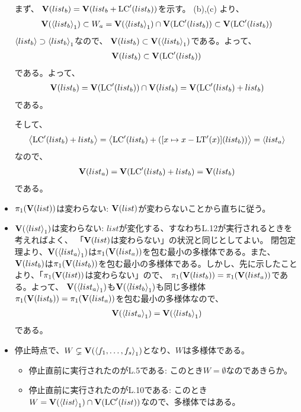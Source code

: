 \documentclass[9pt]{ltjsarticle}
\begin{document}
\begin{myproof}
\begin{itemize}
    まず、
    $\textbf V(list_b) = \textbf V(list_b + {\rm LC}'(list_b))$を示す。
    (b),(c)
    より、
    \begin{align}
      \textbf V(\left\langle list_b \right\rangle_1) \subset W_a =
      \textbf V(\left\langle list_b \right\rangle_1) \cap \textbf V({\rm LC}'(list_b))
      \subset
      \textbf V({\rm LC}'(list_b))
    \end{align}
    $\left\langle list_b \right\rangle \supset \left\langle list_b \right\rangle_1$なので、
    $\textbf V(list_b) \subset \textbf V(\left\langle list_b \right\rangle_1)$である。よって、
    \begin{align}
      \textbf V(list_b) \subset \textbf V({\rm LC}'(list_b))
    \end{align}
    である。よって、
    \begin{align}
      \textbf V(list_b) = \textbf V({\rm LC}'(list_b))\cap \textbf V(list_b) =
      \textbf V({\rm LC}'(list_b) + list_b)
    \end{align}
    である。

    そして、
    \begin{align}
      \left\langle {\rm LC}'(list_b) + list_b \right\rangle =
      \left\langle {\rm LC}'(list_b) + ([x\mapsto x-{\rm LT}'(x)](list_b))  \right\rangle
      = \left\langle list_a \right\rangle
    \end{align}
    なので、
    \begin{align}
      \textbf V(list_a) = \textbf V({\rm LC}'(list_b) + list_b)
      =
      \textbf V(list_b)
    \end{align}
    である。

    \item $\pi_1(\textbf V(list))$は変わらない:
    $\textbf V(list)$が変わらないことから直ちに従う。
    \item $\textbf V(\left\langle list \right\rangle_1)$は変わらない:
    $list$が変化する、すなわちL.12が実行されるときを考えればよく、
    「$\textbf V(list)$は変わらない」の状況と同じとしてよい。
    閉包定理より、$\textbf V(\left\langle list_a \right\rangle_1)$は$\pi_1(\textbf V(list_a))$を包む最小の多様体である。また、$\textbf V(list_b)$は$\pi_1(\textbf V(list_b))$を包む最小の多様体である。しかし、先に示したことより、「$\pi_1(\textbf V(list))$は変わらない」ので、
    $\pi_1(\textbf V(list_b))=\pi_1(\textbf V(list_a))$である。よって、
    $\textbf V(\left\langle list_a \right\rangle_1)$も$\textbf V(\left\langle list_b \right\rangle_1)$も同じ多様体
    $\pi_1(\textbf V(list_b))=\pi_1(\textbf V(list_a))$を包む最小の多様体なので、
    \begin{align}
      \textbf V(\left\langle list_a \right\rangle_1) = \textbf V(\left\langle list_b \right\rangle_1)
    \end{align}
    である。
    \item 停止時点で、$W\subsetneq \textbf V(\left\langle f_1,\dots,f_s \right\rangle_1)$となり、$W$は多様体である。
    \begin{itemize}
      \item 停止直前に実行されたのがL.5である:
      このとき$W=\emptyset$なのであきらか。
      \item 停止直前に実行されたのがL.10である:
      このとき$W=\textbf V(\left\langle list \right\rangle_1) \cap \textbf V({\rm LC}'(list))$なので、多様体ではある。


\end{itemize}
\end{itemize}
\end{myproof}
\end{document}
